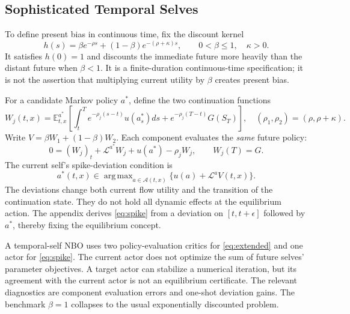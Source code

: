 \documentclass[ecta,nameyear,draft]{econsocart}
\theoremstyle{definition}
\theoremstyle{remark}
\newcommand{\E}{\mathbb E}
\newcommand{\LL}{\mathcal L}
\newcommand{\Act}{\mathcal A}
\DeclareMathOperator*{\argmax}{arg\,max}
\begin{document}
\subsection{Sophisticated Temporal Selves}\label{sec:temporal}
To define present bias in continuous time, fix the discount kernel
\begin{equation}\label{eq:kernel}
 h(s)=\beta e^{-\rho s}+(1-\beta)e^{-(\rho+\kappa)s},
 \qquad 0<\beta\leq1,\quad\kappa>0.
\end{equation}
It satisfies $h(0)=1$ and discounts the immediate future more heavily than the distant future when $\beta<1$. It is a finite-duration continuous-time specification; it is not the assertion that multiplying current utility by $\beta$ creates present bias.

For a candidate Markov policy $a^*$, define the two continuation functions
\begin{equation}\label{eq:components}
 W_j(t,x)=\E_{t,x}^{a^*}\left[\int_t^T e^{-\rho_j(s-t)}u(a_s^*)ds
             +e^{-\rho_j(T-t)}G(S_T)\right],\quad
 (\rho_1,\rho_2)=(\rho,\rho+\kappa).
\end{equation}
Write $V=\beta W_1+(1-\beta)W_2$. Each component evaluates the \emph{same} future policy:
\begin{equation}\label{eq:extended}
 0=(W_j)_t+\LL^{a^*}W_j+u(a^*)-\rho_jW_j,\qquad W_j(T)=G.
\end{equation}
The current self's spike-deviation condition is
\begin{equation}\label{eq:spike}
 a^*(t,x)\in\argmax_{a\in\Act(t,x)}\{u(a)+\LL^aV(t,x)\}.
\end{equation}
The deviations change both current flow utility and the transition of the continuation state. They do not hold all dynamic effects at the equilibrium action. The appendix derives \eqref{eq:spike} from a deviation on $[t,t+\epsilon]$ followed by $a^*$, thereby fixing the equilibrium concept.

A temporal-self NBO uses two policy-evaluation critics for \eqref{eq:extended} and one actor for \eqref{eq:spike}. The current actor does not optimize the sum of future selves' parameter objectives. A target actor can stabilize a numerical iteration, but its agreement with the current actor is not an equilibrium certificate. The relevant diagnostics are component evaluation errors and one-shot deviation gains. The benchmark $\beta=1$ collapses to the usual exponentially discounted problem.
\end{document}
